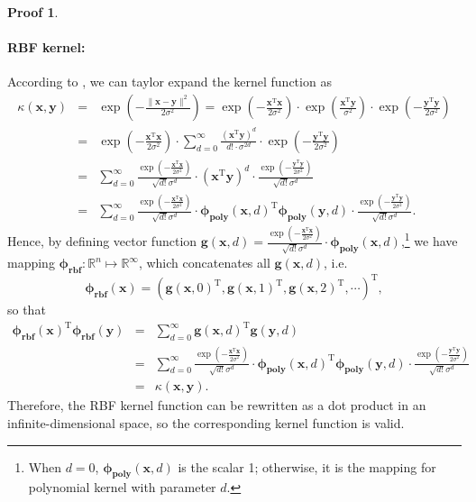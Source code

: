 \documentclass[a4paper,UTF8]{article}
\numberwithin{equation}{section}
\theoremstyle{definition}
\newtheorem*{prove}{Proof}
\begin{document}
\begin{prove}
\paragraph{RBF kernel: } According to \cite{ref: mathb}, we can taylor expand the kernel function as
\begin{eqnarray}
\kappa(\bm{x},\bm{y})&=&\exp(-\frac{\lVert \bm{x}-\bm{y}\rVert^2}{2\sigma^2})=\exp(-\frac{\bm{x}^\mathrm{T}\bm{x}}{2\sigma^2})\cdot\exp(\frac{\bm{x}^\mathrm{T}\bm{y}}{\sigma^2})\cdot\exp(-\frac{\bm{y}^\mathrm{T}\bm{y}}{2\sigma^2})\nonumber\\
&=&\exp(-\frac{\bm{x}^\mathrm{T}\bm{x}}{2\sigma^2})\cdot\sum_{d=0}^{\infty}\frac{(\bm{x}^\mathrm{T}\bm{y})^d}{d!\cdot\sigma^{2d}} \cdot\exp(-\frac{\bm{y}^\mathrm{T}\bm{y}}{2\sigma^2})\nonumber\\
&=&\sum_{d=0}^{\infty}\frac{\exp(-\frac{\bm{x}^\mathrm{T}\bm{x}}{2\sigma^2})}{\sqrt{d!}\sigma^{d}}\cdot(\bm{x}^\mathrm{T}\bm{y})^d\cdot\frac{\exp(-\frac{\bm{y}^\mathrm{T}\bm{y}}{2\sigma^2})}{\sqrt{d!}\sigma^{d}}\nonumber\\
&=&\sum_{d=0}^{\infty}\frac{\exp(-\frac{\bm{x}^\mathrm{T}\bm{x}}{2\sigma^2})}{\sqrt{d!}\sigma^{d}}\cdot\bm{\phi}_{\textbf{poly}}(\bm{x}, d)^\mathrm{T}\bm{\phi}_{\textbf{poly}}(\bm{y},d)\cdot\frac{\exp(-\frac{\bm{y}^\mathrm{T}\bm{y}}{2\sigma^2})}{\sqrt{d!}\sigma^{d}}.
\end{eqnarray}
Hence, by defining vector function $\bm{g}(\bm{x},d)=\frac{\exp(-\frac{\bm{x}^\mathrm{T}\bm{x}}{2\sigma^2})}{\sqrt{d!}\sigma^{d}}\cdot\bm{\phi}_{\textbf{poly}}(\bm{x},d)$,\footnote{When $d=0$, $\bm{\phi}_{\textbf{poly}}(\bm{x},d)$ is the scalar 1; otherwise, it is the mapping for polynomial kernel with parameter $d$.} we have mapping $\bm{\phi}_{\textbf{rbf}}: \mathbb{R}^n\mapsto\mathbb{R}^{\infty}$, which concatenates all $\bm{g}(\bm{x},d)$, i.e.
\begin{equation}
\bm{\phi}_{\textbf{rbf}}(\bm{x})=(\bm{g}(\bm{x},0)^\mathrm{T}, \bm{g}(\bm{x},1)^\mathrm{T}, \bm{g}(\bm{x},2)^\mathrm{T}, \cdots)^\mathrm{T},
\end{equation}
so that 
\begin{eqnarray}
\bm{\phi}_{\textbf{rbf}}(\bm{x})^\mathrm{T}\bm{\phi}_{\textbf{rbf}}(\bm{y})&=&\sum_{d=0}^{\infty}\bm{g}(\bm{x},d)^\mathrm{T}\bm{g}(\bm{y},d)\nonumber\\
&=&\sum_{d=0}^{\infty}\frac{\exp(-\frac{\bm{x}^\mathrm{T}\bm{x}}{2\sigma^2})}{\sqrt{d!}\sigma^{d}}\cdot\bm{\phi}_{\textbf{poly}}(\bm{x}, d)^\mathrm{T}\bm{\phi}_{\textbf{poly}}(\bm{y},d)\cdot\frac{\exp(-\frac{\bm{y}^\mathrm{T}\bm{y}}{2\sigma^2})}{\sqrt{d!}\sigma^{d}}\nonumber\\
&=&\kappa(\bm{x},\bm{y}).
\end{eqnarray}
Therefore, the RBF kernel function can be rewritten as a dot product in an infinite-dimensional space, so the corresponding kernel function is valid.


\end{prove}
\end{document}
